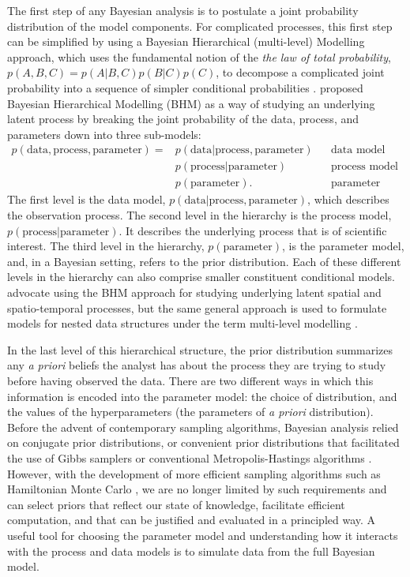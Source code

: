 The first step of any Bayesian analysis is to postulate a joint probability distribution of the model components. For complicated processes, this first step can be simplified by using a Bayesian Hierarchical (multi-level) Modelling approach, which uses the fundamental notion of the \textit{the law of total probability}, $p(A, B, C) = p(A|B, C) p(B|C) p(C)$, to decompose a complicated joint probability into a sequence of simpler conditional probabilities \citep[p.~13]{wikle_2019}. \citet{Berliner_1996} proposed Bayesian Hierarchical Modelling (BHM) as a way of studying an underlying latent process by breaking the joint probability of the data, process, and parameters down into three sub-models:
\begin{align*}
 p(\text{data}, \text{process}, \text{parameter}) = & p(\text{data}| \text{process}, \text{parameter}) && \text{data model} \\
 & p(\text{process}| \text{parameter}) && \text{process model} \\
 & p(\text{parameter}). && \text{parameter model}
\end{align*}
The first level is the data model, $p(\text{data} | \text{process}, \text{parameter})$, which describes the observation process. The second level in the hierarchy is the process model, $p(\mbox{process} | \text{parameter})$. It describes the underlying process that is of scientific interest. The third level in the hierarchy, $p(\text{parameter})$, is the parameter model, and, in a Bayesian setting, refers to the prior distribution. Each of these different levels in the hierarchy can also comprise smaller constituent conditional models. \citet{cressie_2011} advocate using the BHM approach for studying underlying latent spatial and spatio-temporal processes, but the same general approach is used to formulate models for nested data structures under the term multi-level modelling \citep{BDA2020}. 

In the last level of this hierarchical structure, the prior distribution summarizes any \textit{a priori} beliefs the analyst has about the process they are trying to study before having observed the data. There are two different ways in which this information is encoded into the parameter model: the choice of distribution, and the values of the hyperparameters (the parameters of \textit{a priori} distribution). Before the advent of contemporary sampling algorithms, Bayesian analysis relied on conjugate prior distributions, or convenient prior distributions that facilitated the use of Gibbs samplers or conventional Metropolis-Hastings algorithms \citep{gilks_1996}. However, with the development of more efficient sampling algorithms such as Hamiltonian Monte Carlo \citep{betancourt_2017}, we are no longer limited by such requirements and can select priors that reflect our state of knowledge, facilitate efficient computation, and that can be justified and evaluated in a principled way. A useful tool for choosing the parameter model and understanding how it interacts with the process and data models is to simulate data from the full Bayesian model.

